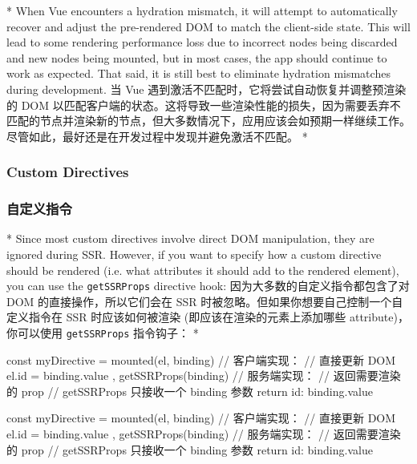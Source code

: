 \begin{paracol}{2} 
   
\switchcolumn[0]*%
When Vue encounters a hydration mismatch, it will attempt to
automatically recover and adjust the pre-rendered DOM to match the
client-side state. This will lead to some rendering performance loss due
to incorrect nodes being discarded and new nodes being mounted, but in
most cases, the app should continue to work as expected. That said, it
is still best to eliminate hydration mismatches during development.
\switchcolumn
当 Vue 遇到激活不匹配时，它将尝试自动恢复并调整预渲染的 DOM
以匹配客户端的状态。这将导致一些渲染性能的损失，因为需要丢弃不匹配的节点并渲染新的节点，但大多数情况下，应用应该会如预期一样继续工作。尽管如此，最好还是在开发过程中发现并避免激活不匹配。
\switchcolumn[0]*%
\subsubsection{Custom Directives}
\switchcolumn
\subsubsection{自定义指令}
\switchcolumn[0]*%
Since most custom directives involve direct DOM manipulation, they are
ignored during SSR. However, if you want to specify how a custom
directive should be rendered (i.e. what attributes it should add to the
rendered element), you can use the \texttt{getSSRProps} directive hook:
\switchcolumn
因为大多数的自定义指令都包含了对 DOM 的直接操作，所以它们会在 SSR
时被忽略。但如果你想要自己控制一个自定义指令在 SSR 时应该如何被渲染
(即应该在渲染的元素上添加哪些 attribute)，你可以使用
\texttt{getSSRProps} 指令钩子：
\switchcolumn[0]*%
\begin{codeJs}
const myDirective = {
  mounted(el, binding) {
    // 客户端实现：
    // 直接更新 DOM
    el.id = binding.value
  },
  getSSRProps(binding) {
    // 服务端实现：
    // 返回需要渲染的 prop
    // getSSRProps 只接收一个 binding 参数
    return {
      id: binding.value
    }
  }
}
\end{codeJs}
\switchcolumn
\begin{codeJs}
const myDirective = {
  mounted(el, binding) {
    // 客户端实现：
    // 直接更新 DOM
    el.id = binding.value
  },
  getSSRProps(binding) {
    // 服务端实现：
    // 返回需要渲染的 prop
    // getSSRProps 只接收一个 binding 参数
    return {
      id: binding.value
    }
  }
}
\end{codeJs}
\end{paracol}



\begin{paracol}{2} 
  
\end{paracol}



\begin{paracol}{2} 
  
\end{paracol}


\begin{paracol}{2} 
  
\end{paracol}



\begin{paracol}{2} 
  
\end{paracol}
